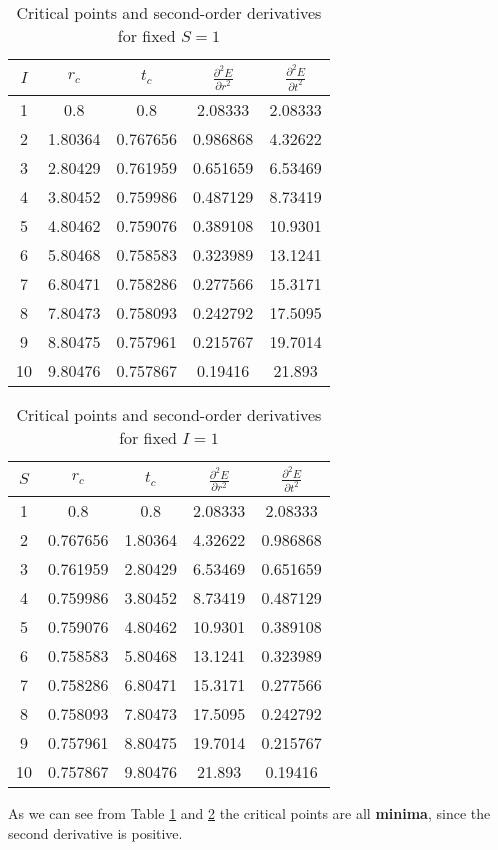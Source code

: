 \documentclass[a4paper]{article}
\begin{document}
\begin{table}[h]
    \centering
    \begin{tabular}{ccccc}
        \toprule
        $I$ & $r_c$ & $t_c$ & $\frac{\partial^2 E}{\partial r^2}$ & $\frac{\partial^2 E}{\partial t^2}$ \\
        \midrule
        1  & 0.8     & 0.8     & 2.08333  & 2.08333  \\
        2  & 1.80364 & 0.767656 & 0.986868  & 4.32622  \\
        3  & 2.80429 & 0.761959 & 0.651659  & 6.53469  \\
        4  & 3.80452 & 0.759986 & 0.487129  & 8.73419  \\
        5  & 4.80462 & 0.759076 & 0.389108  & 10.9301  \\
        6  & 5.80468 & 0.758583 & 0.323989  & 13.1241  \\
        7  & 6.80471 & 0.758286 & 0.277566  & 15.3171  \\
        8  & 7.80473 & 0.758093 & 0.242792  & 17.5095  \\
        9  & 8.80475 & 0.757961 & 0.215767  & 19.7014  \\
        10 & 9.80476 & 0.757867 & 0.19416  & 21.893  \\
        \bottomrule
    \end{tabular}
    \caption{Critical points and second-order derivatives for fixed $S=1$}
    \label{table1}
\end{table}

\begin{table}[h]
    \centering
    \begin{tabular}{ccccc}
        \toprule
        $S$ & $r_c$ & $t_c$ & $\frac{\partial^2 E}{\partial r^2}$ & $\frac{\partial^2 E}{\partial t^2}$ \\
        \midrule
        1  & 0.8     & 0.8     & 2.08333  & 2.08333  \\
        2  & 0.767656 & 1.80364 & 4.32622  & 0.986868  \\
        3  & 0.761959 & 2.80429 & 6.53469  & 0.651659  \\
        4  & 0.759986 & 3.80452 & 8.73419  & 0.487129  \\
        5  & 0.759076 & 4.80462 & 10.9301  & 0.389108  \\
        6  & 0.758583 & 5.80468 & 13.1241  & 0.323989  \\
        7  & 0.758286 & 6.80471 & 15.3171  & 0.277566  \\
        8  & 0.758093 & 7.80473 & 17.5095  & 0.242792  \\
        9  & 0.757961 & 8.80475 & 19.7014  & 0.215767  \\
        10 & 0.757867 & 9.80476 & 21.893  & 0.19416  \\
        \bottomrule
    \end{tabular}
    \caption{Critical points and second-order derivatives for fixed $I=1$}
    \label{table2}
\end{table}

As we can see from Table \ref{table1} and \ref{table2} the critical points are all \textbf{minima}, since the second derivative is positive.
\end{document}
